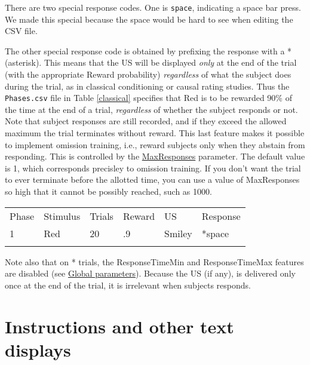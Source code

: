 \documentclass[11pt,]{article}
\renewcommand{\medskip}{}
\begin{document}
There are two special response codes. One is \texttt{space}, indicating
a space bar press. We made this special because the space would be hard
to see when editing the CSV file.

The other special response code is obtained by prefixing the response
with a * (asterisk). This means that the US will be displayed
\emph{only} at the end of the trial (with the appropriate Reward
probability) \emph{regardless} of what the subject does during the
trial, as in classical conditioning or causal rating studies. Thus the
\texttt{Phases.csv} file in Table \ref{classical} specifies that Red is
to be rewarded 90\% of the time at the end of a trial, \emph{regardless}
of whether the subject responds or not. Note that subject responses are
still recorded, and if they exceed the allowed maximum the trial
terminates without reward. This last feature makes it possible to
implement omission training, i.e., reward subjects only when they
abstain from responding. This is controlled by the
\hyperref[maxresponses]{MaxResponses} parameter. The default value is 1,
which corresponds precisley to omission training. If you don't want the
trial to ever terminate before the allotted time, you can use a value of
MaxResponses so high that it cannot be possibly reached, such as 1000.

\begin{table*}[t]\begin{center}\small\begin{tabular}{@{}llllll@{}}
\hline\noalign{\medskip}
Phase & Stimulus & Trials & Reward & US & Response
\\\noalign{\medskip}
\hline\noalign{\medskip}
1 & Red & 20 & .9 & Smiley & *space
\\\noalign{\medskip}
\hline
\noalign{\medskip}
\end{tabular}\caption{A \texttt{Phases.csv} file using the Response notation *space
to indicate a classical conditioning trial in which the US is delivered
at the end of the trial regardless of subject behavior.
\label{classical}}
\end{center}\end{table*}

Note also that on * trials, the ResponseTimeMin and ResponseTimeMax
features are disabled (see \hyperref[global]{Global parameters}).
Because the US (if any), is delivered only once at the end of the trial,
it is irrelevant when subjects responds.

\section{Instructions and other text displays}
\end{document}
